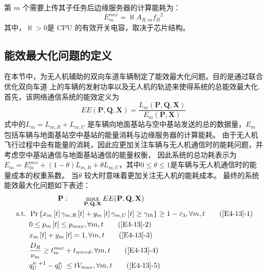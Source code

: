 第 $m$ 个需要上传其子任务后边缘服务器的计算能耗为：
\begin{equation} \label{E4-55}
E_{m}^{mec}=\aleph A_{R,m}{f_R}^2%
\end{equation}
其中，$\aleph > 0 $是 CPU 的有效开关电容，取决于芯片结构。
\subsection{能效最大化问题的定义}\label{section4-2-3}
在本节中，为无人机辅助的双向车道车辆制定了能效最大化问题。目的是通过联合优化双向车道
上的车辆的发射功率以及无人机的轨迹来使得系统的总能效最大化.
首先，该网络通信系统的能效定义为
\begin{equation} \label{E4-12}
EE(\mathbf{P}, \mathbf{Q}, \mathbf{X})=
{\frac{{{L}_{m}}\left( \mathbf{P}, \mathbf{Q}, \mathbf{X} \right)}
{{{E}_{m}}\left( \mathbf{P}, \mathbf{X} \right)}}
\end{equation}
式中的${{L}_{m}={L}_{m,R}+{L}_{m,U}}$ 是车辆向地面基站与空中基站发送的总的数据量，${E}_{m}$ 包括车辆与地面基站空中基站的能量消耗与边缘服务器的计算能耗。
由于无人机飞行过程中会有能量的消耗，因此应更加关注车辆与无人机通信时的能耗问题，并考虑空中基站通信与地面基站通信的能量权衡，
因此系统的总功耗表示为${{E}_{m}=E_{m}^{mec}+(1-\theta){L}_{m,R}+\theta{L}_{m,U}}$，其中$0\le \theta \le 1$是车辆与无人机通信时的能量成本的权重系数。
当$\theta$ 较大时意味着更加关注无人机的能耗成本。
最终的系统能效最大化问题如下表述：
\begin{align}
& \qquad\qquad\textbf{P}:\qquad \max_{ \mathbf{P}, \mathbf{Q}, \mathbf{X} }  EE(\mathbf{P}, \mathbf{Q}, \mathbf{X})                \label{E4-13}\\
\text { s.t. }
& \Pr\left\{x_m\left[t\right]\gamma_{m,R}\left[t\right]+y_m\left[t\right]\gamma_{m,U}\left[t\right]\geq \gamma_{th}\right\}\geq1-\varepsilon_3, \forall m,t   \tag{\ref{E4-13}{-1}}      \label{E4-13-1}\\  %
& 0\le p_m\left[t\right]\le p_{max}, \forall m,t                           \tag{\ref{E4-13}{-2}}      \label{E4-13-2}\\  %
& x_m\left[t\right] + y_m\left[t\right]=1, \forall m,t                     \tag{\ref{E4-13}{-3}}      \label{E4-13-3}\\  %
& \frac{D_R}{\nu_m} \geq t_{m}^{mec}+t_{wired} , \forall m,t                           \tag{\ref{E4-13}{-4}}      \label{E4-13-4}\\  %
& q_U^{n\mathrm{\ }+1}-q_U^{n\mathrm{\ }}\le tV_{max}, \forall m,t         \tag{\ref{E4-13}{-5}}      \label{E4-13-5}    %
\end{align}

